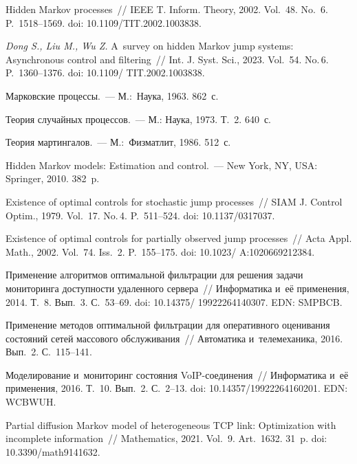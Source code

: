 \begin{multicols}{2}
{{\begin{thebibliography}{99}
  Hidden Markov processes~// IEEE T. 
Inform. Theory, 2002. Vol.~48. No.~6. P.~1518--1569.
doi: 10.1109/TIT.2002.1003838.

{\it Dong S., Liu M., Wu Z.} A~survey on hidden Markov jump systems: 
Asynchronous control and filtering~// Int. J. Syst. Sci., 
2023. Vol.~54. No.\,6. P.~1360--1376. doi: 10.1109/ TIT.2002.1003838.

 Марковские процессы.~--- М.:~Наука, 1963. 862~с.

 Теория случайных процессов.~--- М.: Наука, 
1973.  Т.~2. 640~с.

 Теория мартингалов.~--- М.:~Физматлит, 1986. 512~с.

 Hidden Markov models: Estimation and 
control.~--- New York, NY, USA: Springer, 2010. 382~p.

 Existence of optimal controls for stochastic jump 
processes~// SIAM J. Control Optim., 1979. Vol.~17. No.\,4. P.~511--524. doi: 10.1137/0317037.

 Existence of optimal controls for 
partially observed jump processes~// Acta Appl. Math., 2002. Vol.~74. Iss.~2. P.~155--175.
doi: 10.1023/ A:1020669212384.

 Применение алгоритмов оптимальной фильтрации для решения задачи 
мониторинга доступности удаленного сервера~// Информатика и~её применения, 2014. 
Т.~8. Вып.~3. С.~53--69. doi: 10.14375/ 19922264140307. EDN: SMPBCB.


 Применение методов оптимальной фильтрации для оперативного 
оценивания состояний сетей массового обслуживания~// Автоматика и~телемеханика, 2016. Вып.~2. С.~115--141. 

 Моделирование и~мониторинг состояния VoIP-со\-еди\-не\-ния~// 
Информатика и~её применения, 2016. Т.~10. Вып.~2. С.~2--13. doi: 
10.14357/19922264160201. EDN: WCBWUH.

 

 Partial diffusion Markov model 
of heterogeneous TCP link: Optimization with incomplete information~// 
Mathematics, 2021. Vol.~9. Art.~1632. 31~p. doi: 10.3390/math9141632.


\end{thebibliography}}}
\end{multicols}
